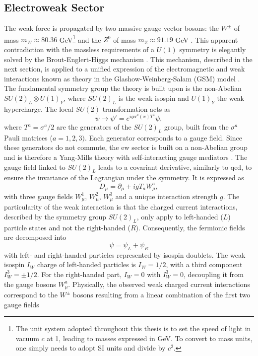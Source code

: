 \subsection{Electroweak Sector}
The weak force is propagated by two massive gauge vector bosons: the $W^{\pm}$ of mass $m_W \approx 80.36$ GeV\footnote{The unit system adopted throughout this thesis is to set the speed of light in vacuum $c$ at 1, leading to masses expressed in GeV. To convert to mass units, one simply needs to adopt SI units and divide by $c^2$.} and the $Z^0$ of mass $m_Z \approx 91.19$ GeV \cite{Tanabashi:2018oca}. This apparent contradiction with the massless requirements of a $U(1)$ symmetry is elegantly solved by the Brout-Englert-Higgs mechanism \cite{Englert:1964et, PhysRevLett.13.508}. This mechanism, described in the next section, is applied to a unified expression of the electromagnetic and weak interactions known as  theory in the Glashow-Weinberg-Salam (GSM) model \cite{GLASHOW1961579, PhysRevLett.19.1264, Salam:1968rm}. The fundamental symmetry group the theory is built upon is the non-Abelian $SU(2)_L \otimes U(1)_Y$, where $SU(2)_L$ is the weak isospin and $U(1)_Y$ the weak hypercharge. The local $SU(2)$ transformation acts as
\begin{equation}\label{eq-GaugeSU2}
    \psi \rightarrow \psi' = e^{i g \alpha^a(x) T^a } \psi,
\end{equation}
where $T^a = \sigma^a / 2$ are the generators of the $SU(2)_L$ group, built from the $\sigma^a$ Pauli matrices ($a = 1, 2, 3)$. Each generator corresponds to a gauge field. Since these generators do not commute, the \gls{ew} sector is built on a non-Abelian group and is therefore a Yang-Mills theory with self-interacting gauge mediators \cite{PhysRev.96.191}. The gauge field linked to $SU(2)_L$ leads to a covariant derivative, similarly to \gls{qed}, to ensure the invariance of the Lagrangian under the symmetry. It is expressed as
\begin{equation}\label{eq-CovDerSU2}
   D_{\mu}  = \partial_{\mu} + igT_a W_{\mu}^a,
\end{equation}
with three gauge fields $W_{\mu}^1$, $W_{\mu}^2$, $W_{\mu}^3$ and a unique interaction strength $g$. The particularity of the weak interaction is that the charged current interactions, described by the symmetry group $SU(2)_L$, only apply to left-handed ($L$) particle states and not the right-handed ($R$). Consequently, the fermionic fields are decomposed into \[\psi = \psi_L + \psi_R\] with left- and right-handed particles represented by isospin doublets. The weak isospin $I_W$ charge of left-handed particles is $I_W = 1/2$, with a third component $I_W^3 = \pm  1/2$. For the right-handed part, $I_W = 0$ with $I_W^3 = 0$, decoupling it from the gauge bosons $W_{\mu}^a$. Physically, the observed weak charged current interactions correspond to the $W^{\pm}$ bosons resulting from a linear combination of the first two gauge fields
